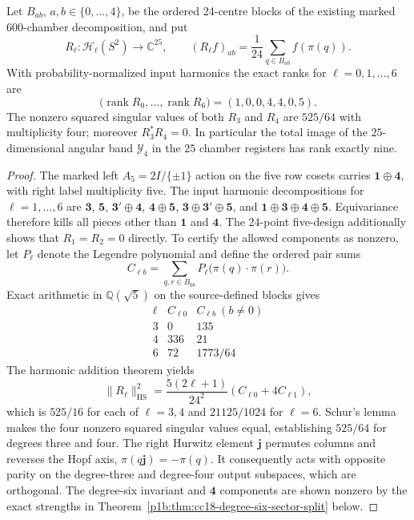 \documentclass[11pt]{article}
\begin{document}
\begin{theorem}
\label{p1b:thm:cc18-angular-selection}
Let $B_{ab}$, $a,b\in\{0,\ldots,4\}$, be the ordered 24-centre
blocks of the existing marked 600-chamber decomposition, and put
\[
R_\ell:\mathcal H_\ell(S^2)\to\mathbb C^{25},\qquad
(R_\ell f)_{ab}=\frac1{24}\sum_{q\in B_{ab}} f(\pi(q)).
\]
With probability-normalized input harmonics the exact ranks for
$\ell=0,1,\ldots,6$ are
\[
\boxed{\bigl(\operatorname{rank}R_0,\ldots,
\operatorname{rank}R_6\bigr)=(1,0,0,4,4,0,5).}
\]
The nonzero squared singular values of both $R_3$ and $R_4$ are
$525/64$ with multiplicity four; moreover $R_3^*R_4=0$.
In particular the total image of the $25$-dimensional angular band
$\mathcal Y_4$ in the $25$ chamber registers has rank exactly nine.
\end{theorem}
\begin{proof}
The marked left $A_5=2I/\{\pm1\}$ action on the five row cosets
carries $\mathbf1\oplus\mathbf4$, with right label multiplicity five.
The input harmonic decompositions for $\ell=1,\ldots,6$ are
$\mathbf3$, $\mathbf5$, $\mathbf3'\oplus\mathbf4$,
$\mathbf4\oplus\mathbf5$,
$\mathbf3\oplus\mathbf3'\oplus\mathbf5$, and
$\mathbf1\oplus\mathbf3\oplus\mathbf4\oplus\mathbf5$.
Equivariance therefore kills all pieces other than $\mathbf1$ and
$\mathbf4$.  The 24-point five-design additionally shows that
$R_1=R_2=0$ directly.  To certify the allowed components as nonzero,
let $P_\ell$ denote the Legendre polynomial and define the ordered
pair sums
\[
C_{\ell b}=\sum_{q,r\in B_{0b}}P_\ell\bigl(\pi(q)\cdot\pi(r)\bigr).
\]
Exact arithmetic in $\mathbb Q(\sqrt5)$ on the source-defined blocks gives
\[
\begin{array}{c|rr}
\ell&C_{\ell0}& C_{\ell b}\ (b\ne0)\\\hline
3&0&135\\
4&336&21\\
6&72&1773/64
\end{array}
\]
The harmonic addition theorem yields
\[
\|R_\ell\|_{\mathrm{HS}}^2
=\frac{5(2\ell+1)}{24^2}(C_{\ell0}+4C_{\ell1}),
\]
which is $525/16$ for each of $\ell=3,4$ and $21125/1024$
for $\ell=6$.  Schur's lemma makes the four nonzero squared singular
values equal, establishing $525/64$ for degrees three and four.
The right Hurwitz element $\mathbf j$ permutes columns and reverses the
Hopf axis, $\pi(q\mathbf j)=-\pi(q)$.  It consequently acts with
opposite parity on the degree-three and degree-four output subspaces,
which are orthogonal.  The degree-six invariant and $\mathbf4$
components are shown nonzero by the exact strengths in
Theorem~\ref{p1b:thm:cc18-degree-six-sector-split} below.
\end{proof}
\end{document}
